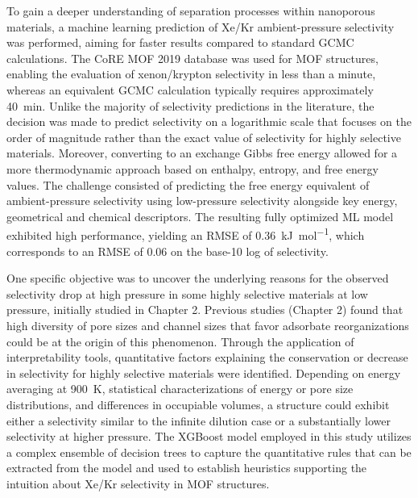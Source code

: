 \documentclass[main]{subfiles}
\begin{document}
To gain a deeper understanding of separation processes within nanoporous materials, a machine learning prediction of Xe/Kr ambient-pressure selectivity was performed, aiming for faster results compared to standard GCMC calculations. The CoRE MOF 2019 database was used for MOF structures, enabling the evaluation of xenon/krypton selectivity in less than a minute, whereas an equivalent GCMC calculation typically requires approximately \SI{40}{\minute}. 
Unlike the majority of selectivity predictions in the literature, the decision was made to predict selectivity on a logarithmic scale that focuses on the order of magnitude rather than the exact value of selectivity for highly selective materials. Moreover, converting to an exchange Gibbs free energy allowed for a more thermodynamic approach based on enthalpy, entropy, and free energy values. The challenge consisted of predicting the free energy equivalent of ambient-pressure selectivity using low-pressure selectivity alongside key energy, geometrical and chemical descriptors. The resulting fully optimized ML model exhibited high performance, yielding an RMSE of \SI{0.36}{\kilo\joule\per\mole}, which corresponds to an RMSE of $0.06$ on the base-10 log of selectivity.

One specific objective was to uncover the underlying reasons for the observed selectivity drop at high pressure in some highly selective materials at low pressure, initially studied in Chapter 2. Previous studies (Chapter 2) found that high diversity of pore sizes and channel sizes that favor adsorbate reorganizations could be at the origin of this phenomenon. Through the application of interpretability tools, quantitative factors explaining the conservation or decrease in selectivity for highly selective materials were identified. Depending on energy averaging at \SI{900}{\kelvin}, statistical characterizations of energy or pore size distributions, and differences in occupiable volumes, a structure could exhibit either a selectivity similar to the infinite dilution case or a substantially lower selectivity at higher pressure. The XGBoost model employed in this study utilizes a complex ensemble of decision trees to capture the quantitative rules that can be extracted from the model and used to establish heuristics supporting the intuition about Xe/Kr selectivity in MOF structures.
\end{document}
